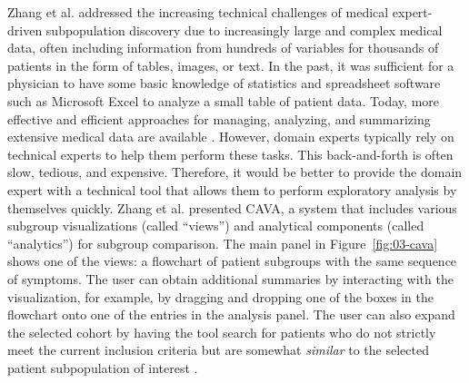 \documentclass[
  oneside]{book}
\begin{document}
Zhang et al. \autocite{Zhang:CAVA2015} addressed the increasing technical challenges of medical expert-driven subpopulation discovery due to increasingly large and complex medical data, often including information from hundreds of variables for thousands of patients in the form of tables, images, or text.
In the past, it was sufficient for a physician to have some basic knowledge of statistics and spreadsheet software such as Microsoft Excel to analyze a small table of patient data.
Today, more effective and efficient approaches for managing, analyzing, and summarizing extensive medical data are available \autocite{Zhang:CAVA2015}.
However, domain experts typically rely on technical experts to help them perform these tasks.
This back-and-forth is often slow, tedious, and expensive.
Therefore, it would be better to provide the domain expert with a technical tool that allows them to perform exploratory analysis by themselves quickly.
Zhang et al. \autocite{Zhang:CAVA2015} presented CAVA, a system that includes various subgroup visualizations (called ``views'') and analytical components (called ``analytics'') for subgroup comparison.
The main panel in Figure~\ref{fig:03-cava} shows one of the views: a flowchart \autocite{wongsuphasawat2012exploring} of patient subgroups with the same sequence of symptoms.
The user can obtain additional summaries by interacting with the visualization, for example, by dragging and dropping one of the boxes in the flowchart onto one of the entries in the analysis panel.
The user can also expand the selected cohort by having the tool search for patients who do not strictly meet the current inclusion criteria but are somewhat \emph{similar} to the selected patient subpopulation of interest \autocite{ebadollahi2010predicting}.
\end{document}
